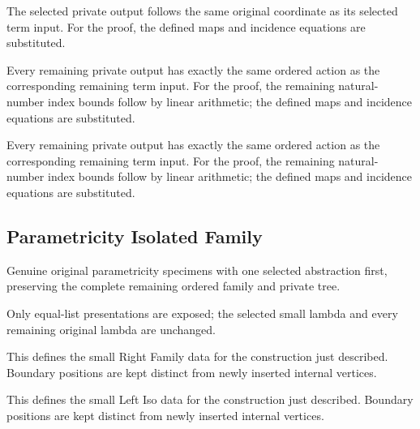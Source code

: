 The selected private output follows the same original coordinate as its selected term input.
For the proof, the defined maps and incidence equations are substituted.
\par{}

Every remaining private output has exactly the same ordered action as the corresponding remaining term input.
For the proof, the remaining natural-number index bounds follow by linear arithmetic; the defined maps and incidence equations are substituted.
\par{}

Every remaining private output has exactly the same ordered action as the corresponding remaining term input.
For the proof, the remaining natural-number index bounds follow by linear arithmetic; the defined maps and incidence equations are substituted.
\par{}

\subsection{Parametricity Isolated Family}
Genuine original parametricity specimens with one selected abstraction first, preserving the complete remaining ordered family and private tree.

Only equal-list presentations are exposed; the selected small lambda and every remaining original lambda are unchanged.
\par{}

This defines the small Right Family data for the construction just described. Boundary positions are kept distinct from newly inserted internal vertices.
\par{}

This defines the small Left Iso data for the construction just described. Boundary positions are kept distinct from newly inserted internal vertices.
\par{}

